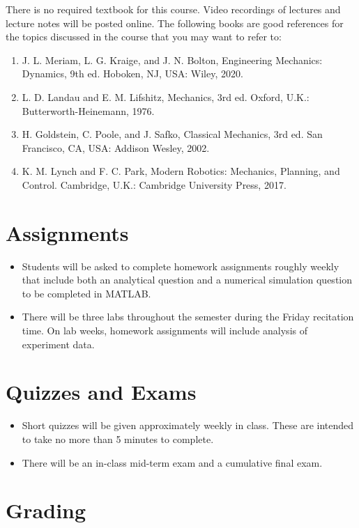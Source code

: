 \documentclass[11pt,letterpaper]{article}
\begin{document}
There is no required textbook for this course. Video recordings of lectures and lecture notes will be posted online. The following books are good references for the topics discussed in the course that you may want to refer to:

\begin{enumerate}
\item J. L. Meriam, L. G. Kraige, and J. N. Bolton, Engineering Mechanics: Dynamics, 9th ed. Hoboken, NJ, USA: Wiley, 2020.
	\item L. D. Landau and E. M. Lifshitz, Mechanics, 3rd ed. Oxford, U.K.: Butterworth-Heinemann, 1976.
	\item H. Goldstein, C. Poole, and J. Safko, Classical Mechanics, 3rd ed. San Francisco, CA, USA: Addison Wesley, 2002.
	\item K. M. Lynch and F. C. Park, Modern Robotics: Mechanics, Planning, and Control. Cambridge, U.K.: Cambridge University Press, 2017.
\end{enumerate}

\section*{Assignments}

\begin{itemize}
	\item Students will be asked to complete homework assignments roughly weekly that include both an analytical question and a numerical simulation question to be completed in MATLAB.
	\item There will be three labs throughout the semester during the Friday recitation time. On lab weeks, homework assignments will include analysis of experiment data.
\end{itemize}

\section*{Quizzes and Exams}

\begin{itemize}
	\item Short quizzes will be given approximately weekly in class. These are intended to take no more than 5 minutes to complete.
	\item There will be an in-class mid-term exam and a cumulative final exam.
\end{itemize}

\section*{Grading}
\end{document}
